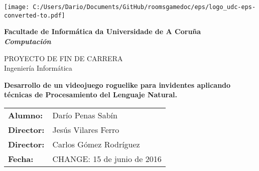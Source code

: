 %
%

%

\begin{titlepage}

	\begin{center}

		\texttt{[image: C:/Users/Dario/Documents/GitHub/roomsgamedoc/eps/logo\_udc-eps-converted-to.pdf]}
		\vspace{2cm}

		{\Large{\textbf{Facultade de Informática da Universidade de A Coruña}}}
		\\
		{\it \large{\textbf{Computación}}}
		\vspace{1cm}

		{\large PROYECTO DE FIN DE CARRERA\\Ingeniería Informática}
		\vspace{1cm}

		\textbf{\Large Desarrollo de un videojuego roguelike para invidentes aplicando técnicas de Procesamiento del Lenguaje Natural.}
		\vspace{7cm}
	\end{center}

	\begin{flushright}
		\begin{tabular}{ll}
			\large{\textbf{Alumno:}}	&
			\large{Darío Penas Sabín} \\

			\large{\textbf{Director:}}	&
			\large{Jesús Vilares Ferro} \\

			\large{\textbf{Director:}}	&
			\large{Carlos Gómez Rodríguez} \\

			\large{\textbf{Fecha:}}	&
			\large{CHANGE: 15 de junio de 2016} \\
		\end{tabular}
	\end{flushright}

\end{titlepage}
